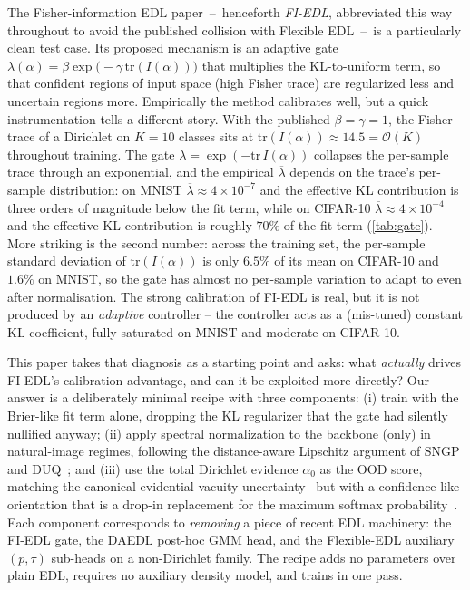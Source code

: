 \documentclass[review,5p,times]{elsarticle}
\begin{document}
The Fisher-information EDL paper~--~henceforth \emph{FI-EDL}, abbreviated
this way throughout to avoid the published collision with Flexible EDL~--~is
a particularly clean test case. Its proposed mechanism is an adaptive gate
$\lambda(\alpha)\!=\!\beta\exp\!\bigl(-\gamma\,\mathrm{tr}(I(\alpha))\bigr)$
that multiplies the KL-to-uniform term, so that confident regions of input
space (high Fisher trace) are regularized less and uncertain regions more.
Empirically the method calibrates well, but a quick instrumentation tells
a different story. With the published $\beta\!=\!\gamma\!=\!1$, the Fisher
trace of a Dirichlet on $K\!=\!10$ classes sits at
$\mathrm{tr}(I(\alpha))\!\approx\!14.5\!=\!\mathcal{O}(K)$ throughout
training. The gate $\lambda\!=\!\exp(-\mathrm{tr}\,I(\alpha))$ collapses
the per-sample trace through an exponential, and the empirical
$\overline{\lambda}$ depends on the trace's per-sample distribution: on
MNIST $\overline{\lambda}\!\approx\!4\!\times\!10^{-7}$ and the effective
KL contribution is three orders of magnitude below the fit term, while
on CIFAR-10 $\overline{\lambda}\!\approx\!4\!\times\!10^{-4}$ and the
effective KL contribution is roughly $70\%$ of the fit term
(\autoref{tab:gate}). More striking is the second number: across the
training set, the per-sample standard deviation of
$\mathrm{tr}(I(\alpha))$ is only $6.5\%$ of its mean on CIFAR-10 and
$1.6\%$ on MNIST, so the gate has almost no per-sample variation to
adapt to even after normalisation. The strong calibration of FI-EDL is
real, but it is not produced by an \emph{adaptive} controller -- the
controller acts as a (mis-tuned) constant KL coefficient, fully
saturated on MNIST and moderate on CIFAR-10.

This paper takes that diagnosis as a starting point and asks: what
\emph{actually} drives FI-EDL's calibration advantage, and can it be
exploited more directly? Our answer is a deliberately minimal recipe with
three components: (i) train with the Brier-like fit term alone, dropping
the KL regularizer that the gate had silently nullified anyway;
(ii) apply spectral normalization to the backbone (only) in
natural-image regimes, following the distance-aware Lipschitz argument of
SNGP and DUQ~\citep{liu2020sngp,vanamersfoort2020duq}; and (iii) use the
total Dirichlet evidence $\alpha_0$ as the OOD score, matching the
canonical evidential vacuity uncertainty~\citep{sensoy2018edl} but with a
confidence-like orientation that is a drop-in replacement for the maximum
softmax probability~\citep{hendrycks2017baseline}. Each component
corresponds to \emph{removing} a piece of recent EDL machinery: the FI-EDL
gate, the DAEDL post-hoc GMM head, and the Flexible-EDL auxiliary
$(p,\tau)$ sub-heads on a non-Dirichlet family. The recipe adds no
parameters over plain EDL, requires no auxiliary density model, and trains
in one pass.
\end{document}
